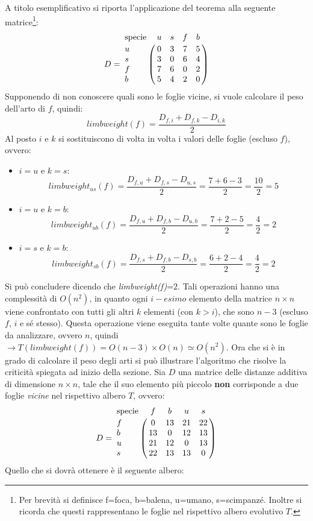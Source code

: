 A titolo esemplificativo si riporta l'applicazione del teorema alla seguente matrice\footnote{Per brevità si definisce f=foca, b=balena, u=umano, s=scimpanzé. Inoltre si ricorda che questi rappresentano le foglie nel rispettivo albero evolutivo $T$.}:
\[
D = \bordermatrix{\text{specie}&u&s&f&b\cr
                u& 0 & 3 & 7 & 5\cr
                s& 3 & 0 & 6 & 4\cr
                f& 7 & 6 & 0 & 2\cr
                b& 5 & 4 & 2 & 0}
\]
Supponendo di non conoscere quali sono le foglie vicine, si vuole calcolare il peso dell'arto di $f$, quindi:
\[limbweight(f)=\frac{D_{f,i}+D_{f,k}-D_{i,k}}{2}\]
Al posto $i$ e $k$ si sostituiscono di volta in volta i valori delle foglie (escluso $f$), ovvero:
\begin{itemize}
	\item $i=u$ e $k=s$:
	\[limbweight_{us}(f)=\frac{D_{f,u}+D_{f,s}-D_{u,s}}{2}=\frac{7+6-3}{2}=\frac{10}{2}=5\]
	\item $i=u$ e $k=b$:
	\[limbweight_{ub}(f)=\frac{D_{f,u}+D_{f,b}-D_{u,b}}{2}=\frac{7+2-5}{2}=\frac{4}{2}=2\]
	\item $i=s$ e $k=b$:
	\[limbweight_{sb}(f)=\frac{D_{f,s}+D_{f,b}-D_{s,b}}{2}=\frac{6+2-4}{2}=\frac{4}{2}=2\]
\end{itemize}
Si può concludere dicendo che \textit{limbweight(f)}=$2$.
\newline
Tali operazioni hanno una complessità di $O(n^2)$, in quanto ogni $i-esimo$  elemento della matrice $n \times n$ viene confrontato con tutti gli altri $k$ elementi (con $k>i$), che sono $n-3$ (escluso $f$, $i$  e sé stesso). Questa operazione viene eseguita tante volte quante sono le foglie da analizzare, ovvero $n$, quindi $\rightarrow T(limbweight(f))=O(n-3)\times O(n)\simeq O(n^2)$.
\newline
Ora che si è in grado di calcolare il peso degli arti si può illustrare l'algoritmo che risolve la criticità spiegata ad inizio della sezione.
\newline
Sia $D$ una matrice delle distanze additiva di dimensione $n\times n$, tale che il suo elemento più piccolo \textbf{non} corrisponde a due foglie \textit{vicine} nel rispettivo albero $T$, ovvero:
\[
D = \bordermatrix{\text{specie}&f&b&u&s\cr
                f& 0 & 13 & 21 & 22\cr
                b& 13 & 0 & 12 & 13\cr
                u& 21 & 12 & 0 & 13\cr
                s& 22 & 13 & 13 & 0}
\]
\newpage
Quello che si dovrà ottenere è il seguente albero:
